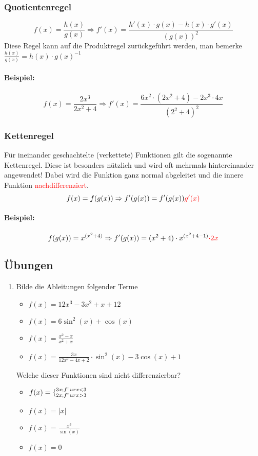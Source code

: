 \subsubsection{Quotientenregel}
\begin{equation*}
f(x)=\frac{h(x)}{g(x)} \Rightarrow f'(x)=\frac{h'(x) \cdot g(x)-h(x) \cdot g'(x)}{(g(x))^2}
\end{equation*}
Diese Regel kann auf die Produktregel zurückgeführt werden, man bemerke $\frac{h(x)}{g(x)} = h(x) \cdot g(x)^{-1}$

\paragraph{Beispiel:}
\begin{equation*}
f(x)=\frac{2x^3}{2x^2+4} \Rightarrow f'(x)=\frac{6x^2 \cdot (2x^2+4)-2x^3 \cdot 4x}{(2^2+4)^2}
\end{equation*}

\subsubsection{Kettenregel}
Für ineinander geschachtelte (verkettete) Funktionen gilt die sogenannte Kettenregel. Diese ist besonders nützlich und wird oft mehrmals hintereinander angewendet! Dabei wird die Funktion ganz normal abgeleitet und die innere Funktion \textcolor{red}{nachdifferenziert}.
\begin{equation*}
f(x)=f(g(x))\Rightarrow f'(g(x))=f'(g(x))\textcolor{red}{g'(x)}
\end{equation*}

\paragraph{Beispiel:}
\begin{equation*}
f(g(x))=x^{(x^2+4)}\Rightarrow f'(g(x))=(x^2+4)\cdot x^{(x^2+4-1)}\textcolor{red}{ \cdot 2x}
\end{equation*}

\subsection{Übungen}
\begin{enumerate}
\item Bilde die Ableitungen folgender Terme
\begin{itemize}
\item $f(x)=12x^3 - 3x^2 + x + 12$
\item $f(x)= 6 \sin^2(x) + \cos(x) $
\item $f(x)= \frac{x^2-x}{x^2+x}$
\item $f(x)= \frac{3x}{12x^2 - 4x + 2} \cdot \sin^2(x) - 3 \cos(x) + 1$
\end{itemize}
Welche dieser Funktionen sind nicht differenzierbar?
\begin{itemize}
\item $f(x)=\lbrace^{3x; f"ur x < 3}_{2x; f"ur x>3}$
\item $f(x)=|x|$
\item $f(x)= \frac{x^3}{\sin(x)}$
\item $f(x)= 0$
\end{itemize}
\end{enumerate}